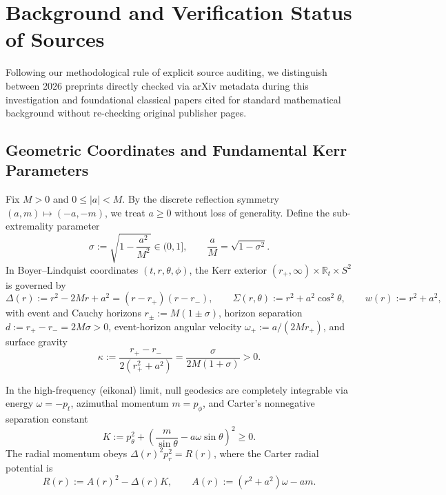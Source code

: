 \documentclass[11pt, a4paper]{article}
\theoremstyle{remark}
\begin{document}
\section{Background and Verification Status of Sources}
\label{sec:background}

Following our methodological rule of explicit source auditing, we distinguish between 2026 preprints directly checked via arXiv metadata during this investigation and foundational classical papers cited for standard mathematical background without re-checking original publisher pages.

\subsection{Geometric Coordinates and Fundamental Kerr Parameters}

Fix $M > 0$ and $0 \le |a| < M$. By the discrete reflection symmetry $(a, m) \mapsto (-a, -m)$, we treat $a \ge 0$ without loss of generality. Define the sub-extremality parameter
\begin{equation}
\sigma := \sqrt{1 - \frac{a^2}{M^2}} \in (0, 1], \qquad \frac{a}{M} = \sqrt{1 - \sigma^2}.
\end{equation}
In Boyer--Lindquist coordinates $(t, r, \theta, \phi)$, the Kerr exterior $(r_+, \infty) \times \mathbb{R}_t \times S^2$ is governed by
\begin{equation}
\Delta(r) := r^2 - 2Mr + a^2 = (r - r_+)(r - r_-), \qquad \Sigma(r, \theta) := r^2 + a^2\cos^2\theta, \qquad w(r) := r^2 + a^2,
\end{equation}
with event and Cauchy horizons $r_\pm := M(1 \pm \sigma)$, horizon separation $d := r_+ - r_- = 2M\sigma > 0$, event-horizon angular velocity $\omega_+ := a/(2Mr_+)$, and surface gravity
\begin{equation}
\kappa := \frac{r_+ - r_-}{2(r_+^2 + a^2)} = \frac{\sigma}{2M(1 + \sigma)} > 0.
\end{equation}

In the high-frequency (eikonal) limit, null geodesics are completely integrable via energy $\omega = -p_t$, azimuthal momentum $m = p_\phi$, and Carter's nonnegative separation constant
\begin{equation}
\label{eq:carter-K}
K := p_\theta^2 + \left(\frac{m}{\sin\theta} - a\omega\sin\theta\right)^2 \ge 0.
\end{equation}
The radial momentum obeys $\Delta(r)^2 p_r^2 = R(r)$, where the Carter radial potential is
\begin{equation}
\label{eq:carter-R}
R(r) := A(r)^2 - \Delta(r)K, \qquad A(r) := (r^2 + a^2)\omega - am.
\end{equation}
\end{document}
